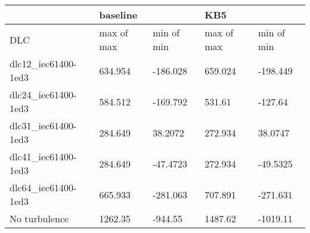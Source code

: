 \begin{tabular}{lllll}
\toprule
                     & \multicolumn{2}{l}{baseline} &         KB5 &\\
\midrule
                 DLC &  max of max &  min of min &  max of max &  min of min \\
 dlc12\_iec61400-1ed3 &     634.954 &    -186.028 &     659.024 &    -198.449 \\
 dlc24\_iec61400-1ed3 &     584.512 &    -169.792 &      531.61 &     -127.64 \\
 dlc31\_iec61400-1ed3 &     284.649 &     38.2072 &     272.934 &     38.0747 \\
 dlc41\_iec61400-1ed3 &     284.649 &    -47.4723 &     272.934 &    -49.5325 \\
 dlc64\_iec61400-1ed3 &     665.933 &    -281.063 &     707.891 &    -271.631 \\
    No turbulence &     1262.35 &     -944.55 &     1487.62 &    -1019.11 \\
\bottomrule
\end{tabular}


